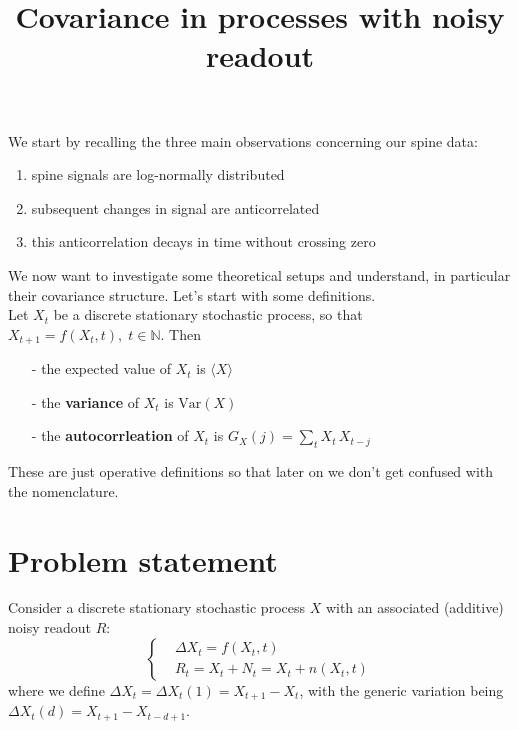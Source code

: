 \documentclass[a4paper, 10pt]{article}
\title{Covariance in processes with noisy readout}
\author{}
\newcommand{\avg}[1]{\langle#1\rangle}
\newcommand{\var}[1]{\text{Var}\left(#1\right)}
\begin{document}
  \maketitle
  
  We start by recalling the three main observations concerning our spine data:
  \begin{enumerate}
    \item spine signals are log-normally distributed
    \item subsequent changes in signal are anticorrelated
    \item this anticorrelation decays in time without crossing zero
  \end{enumerate}

  We now want to investigate some theoretical setups and understand, in
  particular their covariance structure. Let's start with some definitions.\\
  Let $X_t$ be a discrete stationary stochastic process, so that $ X_{t+1} =
  f(X_t, t),\; t\in\mathbb{N} $. Then
  \begin{itemize}
    \item [-] the expected value of $X_t$ is $\avg{X}$
    \item [-] the \textbf{variance} of $X_t$ is $\var{X}$
    \item [-] the \textbf{autocorrleation} of $X_t$ is $G_X(j) = \sum_{t} X_t \, X_{t-j}$
  \end{itemize}

  These are just operative definitions so that later on we don't get confused
  with the nomenclature.

  \section{Problem statement}
  Consider a discrete stationary stochastic process $X$ with an associated
  (additive) noisy readout $R$:
  \begin{equation}
    \begin{cases}
      &\Delta X_{t} = f(X_t, t)\\
      &R_{t} = X_t + N_t = X_{t} + n(X_{t}, t)
    \end{cases}
  \end{equation}
  where we define $\Delta X_t = \Delta X_t(1) = X_{t+1} - X_t$, with the generic
  variation being $\Delta X_t(d) = X_{t+1} - X_{t-d+1}$.
\end{document}
